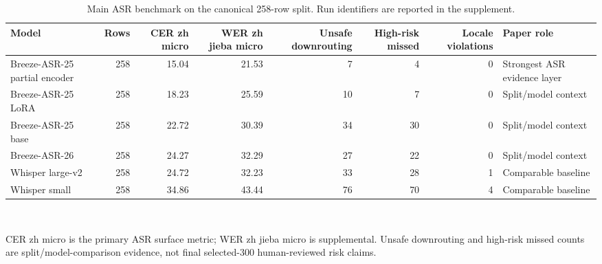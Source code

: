 \begin{table}[!htbp]
\centering
\caption{Main ASR benchmark on the canonical 258-row split. Run identifiers are reported in the supplement.}
\label{tab:main-asr}
\footnotesize
\begin{tabularx}{\linewidth}{@{}L{1.15}R{0.55}R{0.72}R{0.80}R{0.72}R{0.72}R{0.70}L{1.60}@{}}
\toprule
Model & Rows & CER zh micro & WER zh jieba micro & Unsafe downrouting & High-risk missed & Locale violations & Paper role
\\
\midrule
Breeze-ASR-25 partial encoder & 258 & 15.04 & 21.53 &  7 &  4 & 0 & Strongest ASR evidence layer \\
Breeze-ASR-25 LoRA & 258 & 18.23 & 25.59 & 10 &  7 & 0 & Split/model context \\
Breeze-ASR-25 base & 258 & 22.72 & 30.39 & 34 & 30 & 0 & Split/model context \\
Breeze-ASR-26 & 258 & 24.27 & 32.29 & 27 & 22 & 0 & Split/model context \\
Whisper large-v2 & 258 & 24.72 & 32.23 & 33 & 28 & 1 & Comparable baseline \\
Whisper small & 258 & 34.86 & 43.44 & 76 & 70 & 4 & Comparable baseline \\
\bottomrule
\end{tabularx}
\\[0.4em]{\footnotesize\RaggedRight CER zh micro is the primary ASR surface metric; WER zh jieba micro is supplemental. Unsafe downrouting and high-risk missed counts are split/model-comparison evidence, not final selected-300 human-reviewed risk claims.\par}
\end{table}
